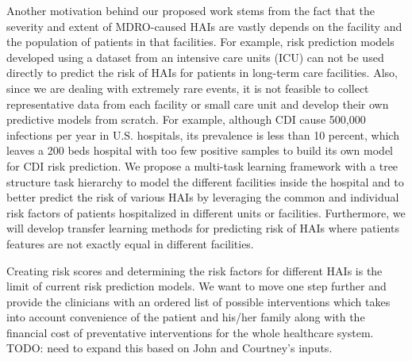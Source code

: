 Another motivation behind our proposed work stems from the fact that the severity and extent of MDRO-caused HAIs are vastly depends on the facility and the population of patients in that facilities. For example, risk prediction models developed using a dataset  from an intensive care units (ICU) can not be used directly to predict the risk of HAIs for patients in long-term care facilities. Also, since we are dealing with extremely rare events, it is not feasible to collect representative data from each facility or small care unit and develop their own predictive models from scratch. For example, although CDI cause 500,000 infections per year in U.S. hospitals, its prevalence is less than 10 percent, which leaves a 200 beds hospital with too few positive samples to build its own model for CDI risk prediction. We propose a multi-task learning framework with a tree structure task hierarchy to model the different facilities inside the hospital and to better predict the risk of various HAIs by leveraging the common and individual risk factors of patients hospitalized in different units or facilities. Furthermore, we will develop transfer learning methods for predicting risk of HAIs where patients features are not exactly equal in different facilities. 

Creating risk scores and determining the risk factors for different HAIs is the limit of current risk prediction models. We want to move one step further and provide the clinicians with an ordered list of possible interventions which takes into account convenience of the patient and his/her family along with the financial cost of preventative interventions for the whole healthcare system.  {\color{red} TODO: need to expand this based on John and Courtney's inputs.}

